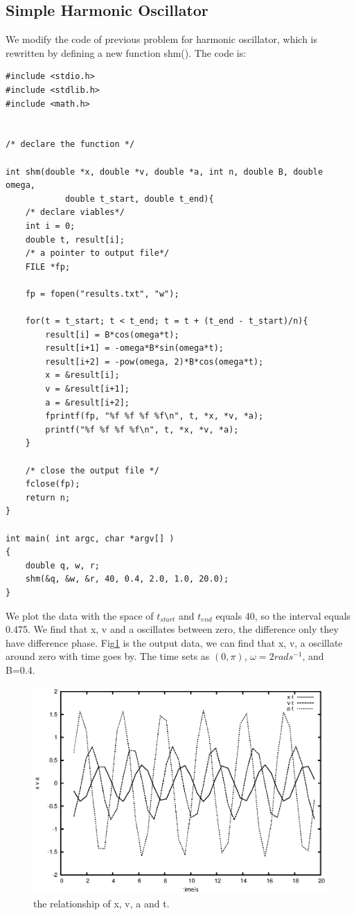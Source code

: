 \documentclass{article}
\begin{document}
\subsection{Simple Harmonic Oscillator}

We modify the code of previous problem for harmonic oscillator, which is rewritten by defining a new function shm(). The code is:

\begin{lstlisting}
#include <stdio.h>
#include <stdlib.h>
#include <math.h>


/* declare the function */

int shm(double *x, double *v, double *a, int n, double B, double omega,  
            double t_start, double t_end){
    /* declare viables*/
    int i = 0;
    double t, result[i];
    /* a pointer to output file*/
    FILE *fp;

    fp = fopen("results.txt", "w");
    
    for(t = t_start; t < t_end; t = t + (t_end - t_start)/n){
        result[i] = B*cos(omega*t);
        result[i+1] = -omega*B*sin(omega*t);
        result[i+2] = -pow(omega, 2)*B*cos(omega*t);
        x = &result[i];
        v = &result[i+1];
        a = &result[i+2];
        fprintf(fp, "%f %f %f %f\n", t, *x, *v, *a);
        printf("%f %f %f %f\n", t, *x, *v, *a);
    }
    
    /* close the output file */
    fclose(fp);
    return n;
}

int main( int argc, char *argv[] )
{
    double q, w, r;
    shm(&q, &w, &r, 40, 0.4, 2.0, 1.0, 20.0);
}\end{lstlisting}

We plot the data with the space of $t_{start}$ and $t_{end}$ equals 40, so the interval equals 0.475. We find that x, v and a oscillates between zero, the difference only they have difference phase. Fig\ref{fig3} is the output data, we can find that x, v, a oscillate around zero with time goes by. The time sets as $(0, \pi)$, $\omega = 2 rads^{-1}$, and B=0.4.

\begin{figure}
    \centering
    \includegraphics[width=5.0in]{output}
    \caption{the relationship of x, v, a and t.}
    \label{fig3}
\end{figure}
\end{document}
